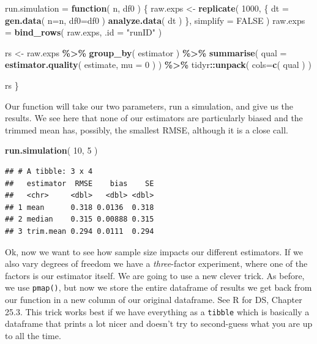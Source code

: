 \documentclass[
]{book}
\newenvironment{Shaded}{\begin{snugshade}}{\end{snugshade}}
\newcommand{\AttributeTok}[1]{\textcolor[rgb]{0.13,0.29,0.53}{#1}}
\newcommand{\ConstantTok}[1]{\textcolor[rgb]{0.56,0.35,0.01}{#1}}
\newcommand{\ControlFlowTok}[1]{\textcolor[rgb]{0.13,0.29,0.53}{\textbf{#1}}}
\newcommand{\DecValTok}[1]{\textcolor[rgb]{0.00,0.00,0.81}{#1}}
\newcommand{\FunctionTok}[1]{\textcolor[rgb]{0.13,0.29,0.53}{\textbf{#1}}}
\newcommand{\NormalTok}[1]{#1}
\newcommand{\OtherTok}[1]{\textcolor[rgb]{0.56,0.35,0.01}{#1}}
\newcommand{\SpecialCharTok}[1]{\textcolor[rgb]{0.81,0.36,0.00}{\textbf{#1}}}
\newcommand{\StringTok}[1]{\textcolor[rgb]{0.31,0.60,0.02}{#1}}
\begin{document}
\begin{Shaded}
\begin{Highlighting}[]
\NormalTok{run.simulation }\OtherTok{=} \ControlFlowTok{function}\NormalTok{( n, df0 ) \{}
\NormalTok{    raw.exps }\OtherTok{\textless{}{-}} \FunctionTok{replicate}\NormalTok{( }\DecValTok{1000}\NormalTok{, \{}
\NormalTok{        dt }\OtherTok{=} \FunctionTok{gen.data}\NormalTok{( }\AttributeTok{n=}\NormalTok{n, }\AttributeTok{df0=}\NormalTok{df0 )}
        \FunctionTok{analyze.data}\NormalTok{( dt )}
\NormalTok{    \}, }\AttributeTok{simplify =} \ConstantTok{FALSE}\NormalTok{ )}
\NormalTok{    raw.exps }\OtherTok{=} \FunctionTok{bind\_rows}\NormalTok{( raw.exps, }\AttributeTok{.id =} \StringTok{"runID"}\NormalTok{ )}

\NormalTok{    rs }\OtherTok{\textless{}{-}}\NormalTok{ raw.exps }\SpecialCharTok{\%\textgreater{}\%}
        \FunctionTok{group\_by}\NormalTok{( estimator ) }\SpecialCharTok{\%\textgreater{}\%}
        \FunctionTok{summarise}\NormalTok{( }\AttributeTok{qual =} \FunctionTok{estimator.quality}\NormalTok{( estimate, }\AttributeTok{mu =} \DecValTok{0}\NormalTok{ ) ) }\SpecialCharTok{\%\textgreater{}\%}
\NormalTok{        tidyr}\SpecialCharTok{::}\FunctionTok{unpack}\NormalTok{( }\AttributeTok{cols=}\FunctionTok{c}\NormalTok{( qual ) )}

\NormalTok{    rs}
\NormalTok{\}}
\end{Highlighting}
\end{Shaded}

Our function will take our two parameters, run a simulation, and give us the
results. We see here that none of our estimators are particularly biased and
the trimmed mean has, possibly, the smallest RMSE, although it is a close
call.

\begin{Shaded}
\begin{Highlighting}[]
\FunctionTok{run.simulation}\NormalTok{( }\DecValTok{10}\NormalTok{, }\DecValTok{5}\NormalTok{ )}
\end{Highlighting}
\end{Shaded}

\begin{verbatim}
## # A tibble: 3 x 4
##   estimator  RMSE    bias    SE
##   <chr>     <dbl>   <dbl> <dbl>
## 1 mean      0.318 0.0136  0.318
## 2 median    0.315 0.00888 0.315
## 3 trim.mean 0.294 0.0111  0.294
\end{verbatim}

Ok, now we want to see how sample size impacts our different estimators. If
we also vary degrees of freedom we have a \emph{three}-factor experiment, where
one of the factors is our estimator itself. We are going to use a new clever
trick. As before, we use \texttt{pmap()}, but now we store the entire dataframe of
results we get back from our function in a new column of our original
dataframe. See R for DS, Chapter 25.3. This trick works best if we have
everything as a \texttt{tibble} which is basically a dataframe that prints a lot
nicer and doesn't try to second-guess what you are up to all the time.
\end{document}
